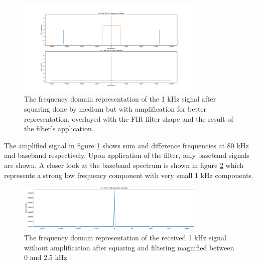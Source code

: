 \begin{figure}[ht!]
    \centering
    \includegraphics[width=0.8\textwidth]{Figures/SigSimulation/yRxsqr_LPFfftAmp1000.png}
    \caption{The frequency domain representation of the 1 kHz signal after squaring done by medium but with amplification for better representation, overlayed with the FIR filter shape and the result of the filter's application.}
    \label{fig:sqrfiltamp}
\end{figure}
The amplified signal in figure \ref{fig:sqrfiltamp} shows sum and difference frequencies at 80 kHz and baseband respectively. Upon application of the filter, only baseband signals are shown. A closer look at the baseband spectrum is shown in figure \ref{fig:sqrcrop} which represents a strong low frequency component with very small 1 kHz components.
\begin{figure}[ht!]
    \centering
    \includegraphics[width=0.8\textwidth]{Figures/SigSimulation/cropzoomedinyRxfilt.png}
    \caption{The frequency domain representation of the received 1 kHz signal without amplification after squaring and filtering magnified between 0 and 2.5 kHz}
    \label{fig:sqrcrop}
\end{figure}

